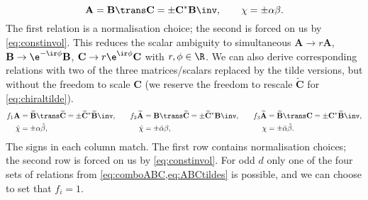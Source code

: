 \documentclass[11pt]{article}
\newcommand{\A}{\mathbf{A}}
\newcommand{\B}{\mathbf{B}}
\renewcommand{\C}{\mathbf{C}}
\newcommand{\At}{\widetilde{\A}}
\newcommand{\Bt}{\widetilde{\B}}
\newcommand{\Ct}{\widetilde{\C}}
\newcommand{\alphat}{\tilde{\alpha}}
\newcommand{\betat}{\tilde{\beta}}
\newcommand{\chit}{\tilde{\chi}}
\begin{document}
%
\begin{equation}\label{eq:comboABC}
  \A = \B\trans \C = \pm \C^\ast \B\inv, \qquad
  \chi = \pm \alpha \beta.
\end{equation}
%
The first relation is a normalisation choice; the second is forced on us by \cref{eq:constinvol}.
This reduces the scalar ambiguity to simultaneous \( \A \rightarrow r \A \),
\( \B \rightarrow \e^{-\ir\phi} \B \), \( \C \rightarrow r\e^{\ir\phi} \C \)
with \( r, \phi \in \R \).
We can also derive corresponding relations with two of the three matrices/scalars replaced by the tilde versions, but without the freedom to scale $\C$ (we reserve the freedom to rescale $\Ct$ for \cref{eq:chiraltilde}).
%
\begin{equation}\label{eq:ABCtildes}
\begin{aligned}
  f_1 \A &= \Bt\trans \Ct = \pm \Ct^\ast \Bt\inv, &\quad
  f_2 \At &= \B\trans \Ct = \pm \Ct^\ast \B\inv, &\quad
  f_3 \At &= \Bt\trans \C = \pm \C^\ast \Bt\inv, \\
  {\chit} &= \pm {\alpha} {\betat}, &
  {\chit} &= \pm {\alphat} {\beta}, &
  {\chi} &= \pm {\alphat} {\betat}.
\end{aligned}
\end{equation}
%
The signs in each column match.
The first row contains normalisation choices; the second row is forced on us by \cref{eq:constinvol}.
For odd $d$ only one of the four sets of relations from \cref{eq:comboABC,eq:ABCtildes} is possible, and we can choose to set that $f_i = 1$.
\end{document}
